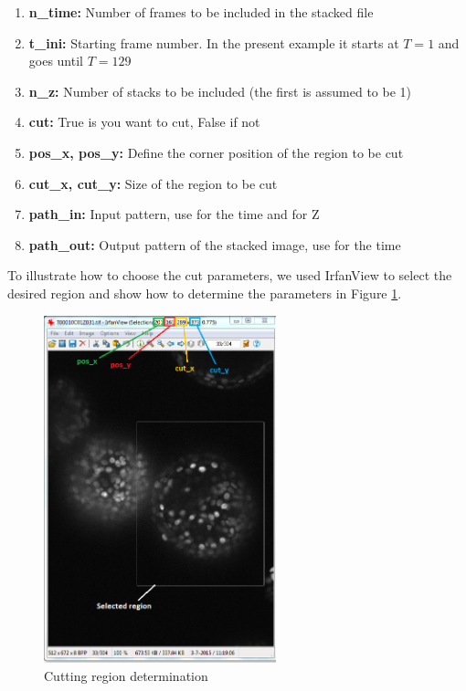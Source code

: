 \documentclass[12pt]{article}
\begin{document}
\begin{enumerate}
\item{\textbf{n\_time:} Number of frames to be included in the stacked file}
\item{\textbf{t\_ini:} Starting frame number. In the present example it starts at $T=1$ and goes until $T=129$}
\item{\textbf{n\_z:} Number of stacks to be included (the first is assumed to be 1)}
\item{\textbf{cut:} True is you want to cut, False if not}
\item{\textbf{pos\_x, pos\_y:} Define the corner position of the region to be cut}
\item{\textbf{cut\_x, cut\_y:} Size of the region to be cut}
\item{\textbf{path\_in:} Input pattern, use  for the time and  for Z}
\item{\textbf{path\_out:}  Output pattern of the stacked image, use  for the time}
\end{enumerate}

To illustrate how to choose the cut parameters, we used IrfanView to select the desired region and show how to determine the parameters in Figure \ref{fig_cutting}.

\begin{figure}[h]
\centering
\includegraphics[width=0.6\textwidth]{cutting_region.png}
\caption{Cutting region determination \label{fig_cutting}}
\end{figure}


\end{document}
